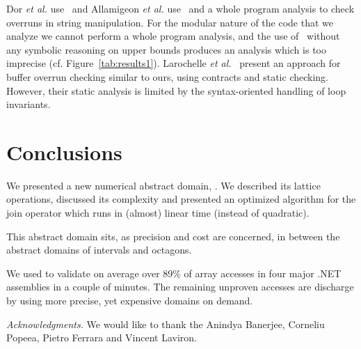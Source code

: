 \documentclass{elsart}
\begin{document}
Dor \emph{et al.} \cite{Dor03} use \Polyhedra\ and Allamigeon \emph{et al.} \cite{AllamigeonEtAl06} use \Intervals\ and a whole program
analysis to check overruns in string manipulation.  For the modular
nature of the code that we analyze we cannot perform a whole program
analysis, and the use of \Intervals\ without any symbolic reasoning on
upper bounds produces an analysis which is too imprecise (cf. Figure~\ref{tab:results1}).  
Larochelle \emph{et al.}~\cite{LarochelleEvans01} present an approach for buffer overrun checking similar to ours, using contracts and static checking.
However, their static analysis is limited by the syntax-oriented handling of loop invariants.



\section{Conclusions}
We presented a new numerical abstract domain, \Pentagons.  We
described its lattice operations, discussed its complexity and
presented an optimized algorithm for the join operator which runs in
(almost) linear time (instead of quadratic).

This abstract domain sits, as precision and cost are concerned, in
between the abstract domains of intervals and octagons.

We used \Pentagons{} to validate on average over 89\% of array
accesses in four major .NET assemblies in a couple of minutes. 
The remaining unproven accesses are discharge by using more precise, yet expensive domains on demand.

\textit{Acknowledgments.} We would like to thank the Anindya Banerjee, Corneliu Popeea, Pietro Ferrara and Vincent Laviron.



\end{document}
